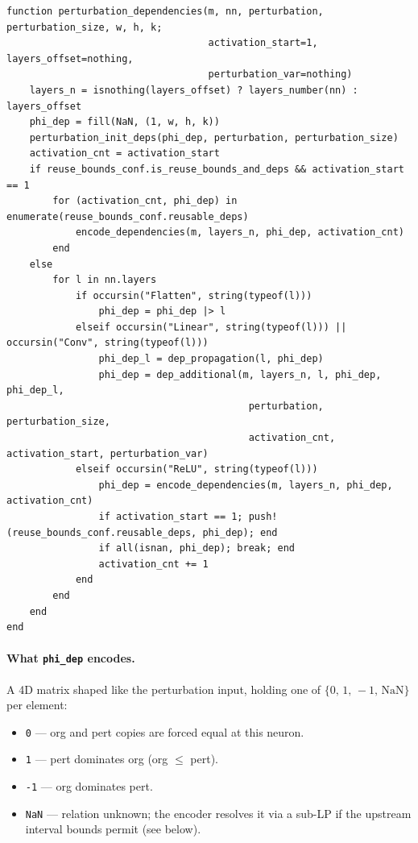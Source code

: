 \documentclass[11pt]{article}
\newcommand{\src}[1]{\texttt{\small #1}}
\begin{document}
\begin{lstlisting}[style=jl]
function perturbation_dependencies(m, nn, perturbation, perturbation_size, w, h, k;
                                   activation_start=1, layers_offset=nothing,
                                   perturbation_var=nothing)
    layers_n = isnothing(layers_offset) ? layers_number(nn) : layers_offset
    phi_dep = fill(NaN, (1, w, h, k))
    perturbation_init_deps(phi_dep, perturbation, perturbation_size)
    activation_cnt = activation_start
    if reuse_bounds_conf.is_reuse_bounds_and_deps && activation_start == 1
        for (activation_cnt, phi_dep) in enumerate(reuse_bounds_conf.reusable_deps)
            encode_dependencies(m, layers_n, phi_dep, activation_cnt)
        end
    else
        for l in nn.layers
            if occursin("Flatten", string(typeof(l)))
                phi_dep = phi_dep |> l
            elseif occursin("Linear", string(typeof(l))) || occursin("Conv", string(typeof(l)))
                phi_dep_l = dep_propagation(l, phi_dep)
                phi_dep = dep_additional(m, layers_n, l, phi_dep, phi_dep_l,
                                          perturbation, perturbation_size,
                                          activation_cnt, activation_start, perturbation_var)
            elseif occursin("ReLU", string(typeof(l)))
                phi_dep = encode_dependencies(m, layers_n, phi_dep, activation_cnt)
                if activation_start == 1; push!(reuse_bounds_conf.reusable_deps, phi_dep); end
                if all(isnan, phi_dep); break; end
                activation_cnt += 1
            end
        end
    end
end
\end{lstlisting}

\paragraph{What \src{phi\_dep} encodes.}
A 4D matrix shaped like the perturbation input, holding one of
$\{0,\,1,\,-1,\,\mathrm{NaN}\}$ per element:
\begin{itemize}[noitemsep]
  \item \texttt{0} --- org and pert copies are forced equal at this
    neuron.
  \item \texttt{1} --- pert dominates org (org $\le$ pert).
  \item \texttt{-1} --- org dominates pert.
  \item \texttt{NaN} --- relation unknown; the encoder resolves it via a
    sub-LP if the upstream interval bounds permit (see below).
\end{itemize}
\end{document}
